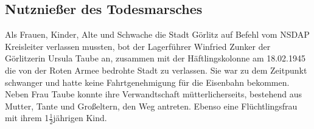 \documentclass[a4paper,12pt,ngerman,
]{nisebook}
\begin{document}
\begin{fshaded}\vspace{-.5cm}\subsection*{Nutznießer des Todesmarsches}
Als Frauen, Kinder, Alte und Schwache die Stadt Görlitz auf Befehl vom NSDAP Kreisleiter verlassen mussten, bot der Lagerführer Winfried Zunker der Görlitzerin Ursula Taube an, zusammen mit der Häftlingskolonne am 18.02.1945 die von der Roten Armee bedrohte Stadt zu verlassen. Sie war zu dem Zeitpunkt schwanger und hatte keine Fahrtgenehmigung für die Eisenbahn bekommen. Neben Frau Taube konnte ihre Verwandtschaft mütterlicherseits, bestehend aus Mutter, Tante und Großeltern, den Weg antreten. Ebenso eine Flüchtlingsfrau mit ihrem 1$\frac{1}{2}$jährigen Kind.


\end{fshaded}
\end{document}
